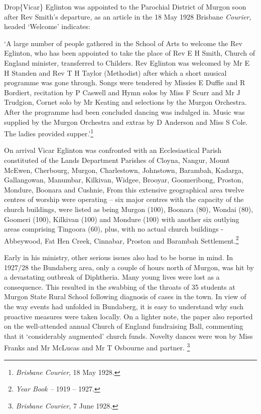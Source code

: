 Drop\{Vicar\} Eglinton was appointed to the Parochial District of Murgon soon after Rev Smith's departure, as an article in the 18 May 1928 Brisbane \emph{Courier,} headed `Welcome' indicates:

`A large number of people gathered in the School of Arts to welcome the Rev Eglinton, who has been appointed to take the place of Rev E H Smith, Church of England minister, transferred to Childers. Rev Eglinton was welcomed by Mr E H Standen and Rev T H Taylor (Methodist) after which a short musical programme was gone through. Songs were tendered by Missies E Duffie and R Bordiert, recitation by P Caswell and Hymn solos by Miss F Scurr and Mr J Trudgion, Cornet solo by Mr Keating and selections by the Murgon Orchestra. After the programme had been concluded dancing was indulged in. Music was supplied by the Murgon Orchestra and extras by D Anderson and Miss S Cole. The ladies provided supper.'\footnote{\emph{Brisbane Courier}, 18 May 1928.}

On arrival Vicar Eglinton was confronted with an Ecclesiastical Parish constituted of the Lands Department Parishes of Cloyna, Nangur, Mount McEwen, Cherbourg, Murgon, Charlestown, Johnstown, Barambah, Kadarga, Gallangowan, Manumbar, Kilkivan, Widgee, Brooyar, Goomeribong, Proston, Mondure, Boonara and Cushnie, From this extensive geographical area twelve centres of worship were operating -- six major centres with the capacity of the church buildings, were listed as being Murgon (100), Boonara (80), Wondai (80), Goomeri (100), Kilkivan (100) and Mondure (100) with another six outlying areas comprising Tingoora (60), plus, with no actual church buildings - Abbeywood, Fat Hen Creek, Cinnabar, Proston and Barambah Settlement.\footnote{\emph{Year Book --} 1919 -- 1927.}

Early in his ministry, other serious issues also had to be borne in mind. In 1927/28 the Bundaberg area, only a couple of hours north of Murgon, was hit by a devastating outbreak of Diphtheria. Many young lives were lost as a consequence. This resulted in the swabbing of the throats of 35 students at Murgon State Rural School following diagnosis of cases in the town. In view of the way events had unfolded in Bundaberg, it is easy to understand why such proactive measures were taken locally. On a lighter note, the paper also reported on the well-attended annual Church of England fundraising Ball, commenting that it `considerably augmented' church funds. Novelty dances were won by Miss Franks and Mr McLucas and Mr T Osbourne and partner. \footnote{\emph{Brisbane Courier,} 7 June 1928\emph{.}}

